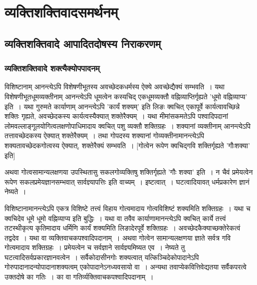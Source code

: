 	\section{व्यक्तिशक्तिवादसमर्थनम्}

		\subsection{व्यक्तिशक्तिवादे आपादितदोषस्य निराकरणम् }

			\subsubsection{व्यक्तिशक्तिवादे शक्त्यैक्योपपादनम्}

				विशिष्टानाम् आनन्त्येऽपि विशेषणीभूतस्य अवच्छेदकधर्मस्य ऐक्ये अवच्छेद्यैक्यं सम्भवति~। यथा विशेषणीभूतधूमव्यक्तीनाम् आनन्त्येऽपि धूमत्वेन कस्यचिद् एकधूमव्यक्तौ वह्निव्याप्तिर्गृह्यते 'धूमो वह्निव्याप्य' इति~। यथा गुरुमते कार्याणाम् आनन्त्येऽपि 'कार्यं शक्यम्' इति लिङः क्वचित् एकापूर्वे कार्यत्वावच्छिन्ने शक्तिः गृह्यते, अवच्छेदकस्य कार्यत्वस्यैक्यात् शक्तेरैक्यम्~। यथा मीमांसकमतेऽपि पश्वादिपदानां लोमवल्लाङ्गूलयोगित्वलक्षणोपाधिमादाय क्वचित् पशु व्यक्तौ शक्तिग्रहः~। शक्यानां व्यक्तीनाम् आनन्त्येऽपि तत्तावच्छेदकस्य ऐक्यात् शक्तेरैक्यम्~। तथा गोपदस्य शक्यानां गोव्यक्तीनामानन्त्येऽपि शक्यतावच्छेदकगोत्वस्य ऐक्यात्, शक्तेरैक्यं सम्भवति~। [गोत्वेन रूपेण क्वचिद्गवि शक्तिर्गृह्यते 'गौःशक्या' इति] 

				अथवा गोत्वसामान्यलक्षणया उपस्थितासु सकलगोव्यक्तिषु शक्तिर्गृह्यते 'गौः शक्या' इति~। न चैवं प्रमेयत्वेन रूपेण सकलप्रमेयज्ञानसम्भवात् सार्वज्ञ्यापत्तिः इति वाच्यम्~। इष्टत्वात्~। घटत्वादियावत्  धर्मप्रकारेण ज्ञानं नेष्यते~।

				\begin{small}
					
					विशिष्टानामानन्त्येऽपि एकत्र विशिष्टे तत्त्वं विहाय गोत्वमादाय गोत्वविशिष्टं शक्यमिति शक्तिग्रहः~। यथा च क्वचिदेव धूमे धूमो वह्निव्याप्य इति बुद्धिः~। यथा वा तवैव कार्याणामानन्त्येऽपि क्वचित् कार्ये तत्त्वं तटस्थीकृत्य कृतिमादाय धर्मिणि कार्यं शक्यमिति लिङादेरपूर्वे शक्तिग्रहः~। अवच्छेदकैक्याच्छक्तेरेकत्वं तद्वदेव~। यथा वा व्यक्तिवाचकपश्वादिपदानाम्~। अथवा गोत्वेन सामान्यलक्षणया ज्ञाते सर्वत्र गवि गोत्वमादाय शक्तिग्रहः~। प्रमेयत्वेन च सर्वज्ञाने सार्वज्ञ्यमिष्यत एव~। नेष्यते तु घटत्वादिसर्वप्रकारज्ञानवत्वेन~। सर्वैकोदासीनगोः शक्यत्वात् यत्किञ्चिदेकोपादानेऽपि गोरुपादानादन्योपादानाशक्यत्वम् एकोपादानेऽनध्यवसायो वा~। अन्यथा तवाप्येकवित्तिवेद्यतया सर्वैकपरत्वे उक्तदोषे का गतिः~। का वा गतिर्व्यक्तिवाचकपश्वादिपदानाम्~।
				\end{small}

